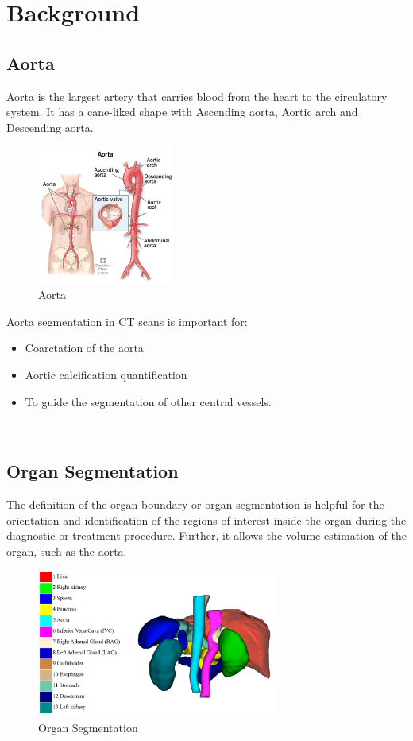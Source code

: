 \section{Background} \label{bg}

\subsection{Aorta}
Aorta is the largest artery that carries blood from the heart to the circulatory system. It has a cane-liked shape with Ascending aorta, Aortic arch and Descending aorta. 

\begin{figure}[ht]
    \centering
    \includegraphics[width=0.4\textwidth]{figures/Intro/Aorta.png}
    \caption[Aorta]{Aorta}
    \label{fig_aorta}
\end{figure}

Aorta segmentation in CT scans is important for:
\begin{itemize}
\item Coarctation of the aorta
\item Aortic calcification quantification
\item To guide the segmentation of other central vessels. 
\end{itemize} ~\\

\subsection{Organ Segmentation}
The definition of the organ boundary or organ segmentation is helpful for the orientation and identification of the regions of interest inside the organ during the diagnostic or treatment procedure. Further, it allows the volume estimation of the organ, such as the aorta.

\begin{figure}[ht]
    \centering
    \includegraphics[width=0.7\textwidth]{figures/Intro/segmentation.png}
    \caption[Organ Segmentation]{Organ Segmentation \cite{Ma-2021-AbdomenCT-1K}}
    \label{fig_seg}
\end{figure}

